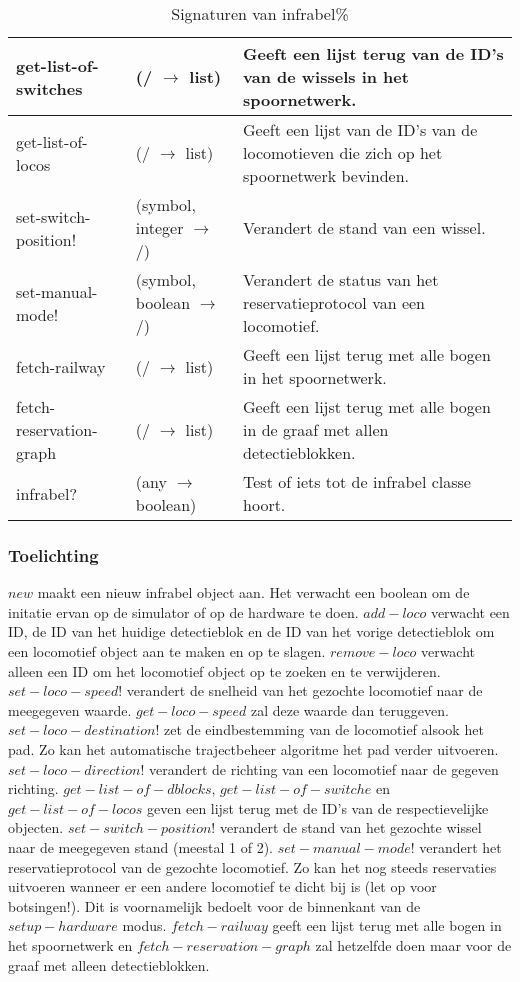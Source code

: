 \documentclass{article}
\begin{document}
\begin{table}[h!]
\begin{tabular}{|p{2.9cm}|p{4cm}|p{6.1cm}|}
                \hline
                get-list-of-switches & (/ $\rightarrow$ list) & Geeft een lijst terug van de ID's van de wissels in het spoornetwerk. \\
                \hline
                get-list-of-locos & (/ $\rightarrow$ list) & Geeft een lijst van de ID's van de locomotieven die zich op het spoornetwerk bevinden.\\
                \hline
                set-switch-position! & (symbol, integer $\rightarrow$ /) & Verandert de stand van een wissel.\\
                \hline
                set-manual-mode! & (symbol, boolean $\rightarrow$ /) & Verandert de status van het reservatieprotocol van een locomotief.\\
                \hline
                fetch-railway & (/ $\rightarrow$ list) & Geeft een lijst terug met alle bogen in het spoornetwerk.\\
                \hline
                fetch-reservation-graph & (/ $\rightarrow$ list) & Geeft een lijst terug met alle bogen in de graaf met allen detectieblokken.\\
                \hline
                infrabel? & (any $\rightarrow$ boolean) & Test of iets tot de infrabel classe hoort.\\
                \hline
        \end{tabular}
        \caption{Signaturen van infrabel\%}
\end{table}
\subsubsection{Toelichting}
$new$ maakt een nieuw infrabel object aan. Het verwacht een boolean om de initatie ervan op de simulator of op de hardware te doen. $add-loco$ verwacht een ID, de ID van het huidige detectieblok en de ID van het vorige detectieblok
om een locomotief object aan te maken en op te slagen. $remove-loco$ verwacht alleen een ID om het locomotief object op te zoeken en te verwijderen. $set-loco-speed!$ verandert de snelheid van het gezochte locomotief naar de meegegeven waarde.
$get-loco-speed$ zal deze waarde dan teruggeven. $set-loco-destination!$ zet de eindbestemming van de locomotief alsook het pad. Zo kan het automatische trajectbeheer algoritme het pad verder uitvoeren. $set-loco-direction!$ verandert de richting van een locomotief naar de gegeven richting. 
$get-list-of-dblocks$, $get-list-of-switche$ en $get-list-of-locos$ geven een lijst terug met de ID's van de respectievelijke objecten. $set-switch-position!$ verandert de stand van het gezochte wissel naar de meegegeven stand (meestal 1 of 2). 
$set-manual-mode!$ verandert het reservatieprotocol van de gezochte locomotief. Zo kan het nog steeds reservaties uitvoeren wanneer er een
andere locomotief te dicht bij is (let op voor botsingen!). Dit is voornamelijk bedoelt voor de binnenkant van de $setup-hardware$ modus. $fetch-railway$ geeft een lijst terug met alle bogen in het spoornetwerk en $fetch-reservation-graph$ zal hetzelfde doen
maar voor de graaf met alleen detectieblokken. 
\end{document}
